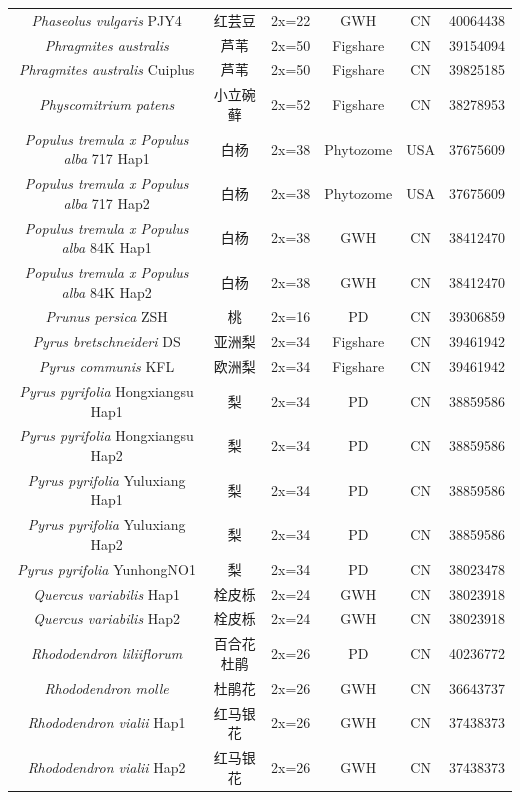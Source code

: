 {{\begin{longtable}{cccccc}
    \textit{Phaseolus vulgaris} PJY4 & 红芸豆 & 2x=22 & GWH & CN & 40064438 \\
    \textit{Phragmites australis} & 芦苇 & 2x=50 & Figshare & CN & 39154094 \\
    \textit{Phragmites australis} Cuiplus & 芦苇 & 2x=50 & Figshare & CN & 39825185 \\
    \textit{Physcomitrium patens} & 小立碗藓 & 2x=52 & Figshare & CN & 38278953 \\
    \textit{Populus tremula x Populus alba} 717 Hap1 & 白杨 & 2x=38 & Phytozome & USA & 37675609 \\
    \textit{Populus tremula x Populus alba} 717 Hap2 & 白杨 & 2x=38 & Phytozome & USA & 37675609 \\
    \textit{Populus tremula x Populus alba} 84K Hap1 & 白杨 & 2x=38 & GWH & CN & 38412470 \\
    \textit{Populus tremula x Populus alba} 84K Hap2 & 白杨 & 2x=38 & GWH & CN & 38412470 \\
    \textit{Prunus persica} ZSH & 桃 & 2x=16 & PD & CN & 39306859 \\
    \textit{Pyrus bretschneideri} DS & 亚洲梨 & 2x=34 & Figshare & CN & 39461942 \\
    \textit{Pyrus communis} KFL & 欧洲梨 & 2x=34 & Figshare & CN & 39461942 \\
    \textit{Pyrus pyrifolia} Hongxiangsu Hap1 & 梨 & 2x=34 & PD & CN & 38859586 \\
    \textit{Pyrus pyrifolia} Hongxiangsu Hap2 & 梨 & 2x=34 & PD & CN & 38859586 \\
    \textit{Pyrus pyrifolia} Yuluxiang Hap1 & 梨 & 2x=34 & PD & CN & 38859586 \\
    \textit{Pyrus pyrifolia} Yuluxiang Hap2 & 梨 & 2x=34 & PD & CN & 38859586 \\
    \textit{Pyrus pyrifolia} YunhongNO1 & 梨 & 2x=34 & PD & CN & 38023478 \\
    \textit{Quercus variabilis} Hap1 & 栓皮栎 & 2x=24 & GWH & CN & 38023918 \\
    \textit{Quercus variabilis} Hap2 & 栓皮栎 & 2x=24 & GWH & CN & 38023918 \\
    \textit{Rhododendron liliiflorum} & 百合花杜鹃 & 2x=26 & PD & CN & 40236772 \\
    \textit{Rhododendron molle} & 杜鹃花 & 2x=26 & GWH & CN & 36643737 \\
    \textit{Rhododendron vialii} Hap1 & 红马银花 & 2x=26 & GWH & CN & 37438373 \\
    \textit{Rhododendron vialii} Hap2 & 红马银花 & 2x=26 & GWH & CN & 37438373 \\

\end{longtable}}}
